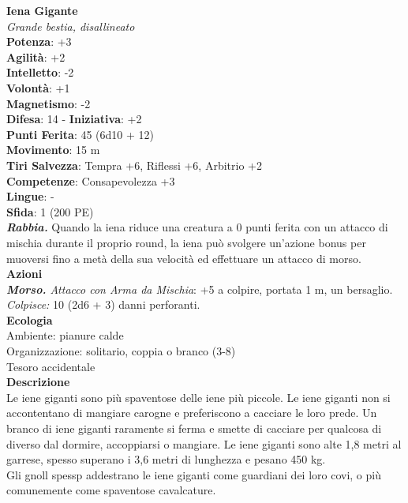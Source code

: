 \begin{multicols}{2}
\medskip\textbf{Iena Gigante}\\
\emph{Grande bestia, disallineato}\\
\textbf{Potenza}: +3\\
\textbf{Agilità}: +2\\
\textbf{Intelletto}: -2\\
\textbf{Volontà}: +1\\
\textbf{Magnetismo}: -2\\
\textbf{Difesa}: 14 - \textbf{Iniziativa}: +2\\
\textbf{Punti Ferita}: 45 (6d10 + 12)\\
\textbf{Movimento}: 15 m\\
\textbf{Tiri Salvezza}: Tempra +6, Riflessi +6, Arbitrio +2 \\
\textbf{Competenze}: Consapevolezza +3\\
\textbf{Lingue}: -\\
\textbf{Sfida}: 1 (200 PE)\smallskip\\
\emph{\textbf{Rabbia.}} Quando la iena riduce una creatura a 0 punti ferita con un attacco di mischia durante il proprio round, la iena può svolgere un'azione bonus per muoversi fino a metà della sua velocità ed effettuare un attacco di morso.\\
\smallskip\textbf{Azioni}\\
\emph{\textbf{Morso.} Attacco con Arma da Mischia}: +5 a colpire, portata 1 m, un bersaglio.\\
\emph{Colpisce:} 10 (2d6 + 3) danni perforanti.\\
\textbf{Ecologia}\\
Ambiente: pianure calde\\
Organizzazione: solitario, coppia o branco (3-8)\\
Tesoro accidentale\\
\textbf{Descrizione}\\
Le iene giganti sono più spaventose delle iene più piccole. Le iene giganti non si accontentano di mangiare carogne e preferiscono a cacciare le loro prede. Un branco di  iene giganti raramente si ferma e smette di cacciare per qualcosa di diverso dal dormire, accoppiarsi o mangiare. Le iene giganti sono alte 1,8 metri al garrese, spesso superano i 3,6 metri di lunghezza e pesano 450 kg.\\

Gli gnoll spessp addestrano le iene giganti come guardiani dei loro covi, o più comunemente come spaventose cavalcature.\\



\end{multicols}
